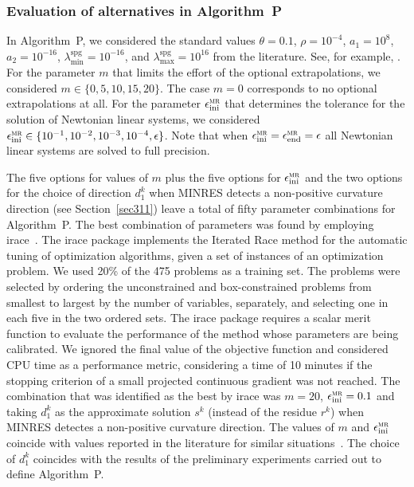 \documentclass[11pt]{article}
\begin{document}
\subsubsection{Evaluation of alternatives in Algorithm~P}

In Algorithm~P, we considered the standard values $\theta = 0.1$, $\rho = 10^{-4}$, $a_1 = 10^8$, $a_2 = 10^{-16}$, $\lambda_{\min}^{\mathrm{spg}} = 10^{-16}$, and $\lambda_{\max}^{\mathrm{spg}} = 10^{16}$ from the literature. See, for example, \cite{bmgencan}. For the parameter $m$ that limits the effort of the optional extrapolations, we considered $m \in \{0, 5, 10, 15, 20\}$. The case $m=0$ corresponds to no optional extrapolations at all. For the parameter $\epsilon^{\mathrm{\textsc{mr}}}_{\mathrm{ini}}$ that determines the tolerance for the solution of Newtonian linear systems, we considered $\epsilon^{\mathrm{\textsc{mr}}}_{\mathrm{ini}} \in \{ 10^{-1}, 10^{-2}, 10^{-3}, 10^{-4}, \epsilon \}$. Note that when $\epsilon^{\mathrm{\textsc{mr}}}_{\mathrm{ini}} = \epsilon^{\mathrm{\textsc{mr}}}_{\mathrm{end}}=\epsilon$ all Newtonian linear systems are solved to full precision. 

The five options for values of $m$ plus the five options for $\epsilon^{\mathrm{\textsc{mr}}}_{\mathrm{ini}}$ and the two options for the choice of direction $d_1^k$ when MINRES detects a non-positive curvature direction (see Section~\ref{sec311}) leave a total of fifty parameter combinations for Algorithm~P. The best combination of parameters was found by employing irace~\cite{irace}. The irace package implements the Iterated Race method for the automatic tuning of optimization algorithms, given a set of instances of an optimization problem. We used 20\% of the 475 problems as a training set. The problems were selected by ordering the unconstrained and box-constrained problems from smallest to largest by the number of variables, separately, and selecting one in each five in the two ordered sets. The irace package requires a scalar merit function to evaluate the performance of the method whose parameters are being calibrated. We ignored the final value of the objective function and considered CPU time as a performance metric, considering a time of 10 minutes if the stopping criterion of a small projected continuous gradient was not reached. The combination that was identified as the best by irace was $m=20$, $\epsilon^{\mathrm{\textsc{mr}}}_{\mathrm{ini}}=0.1$ and taking $d_1^k$ as the approximate solution $s^k$ (instead of the residue $r^k$) when MINRES detectes a non-positive curvature direction. The values of $m$ and $\epsilon^{\mathrm{\textsc{mr}}}_{\mathrm{ini}}$ coincide with values reported in the literature for similar situations~\cite{bmgencan}. The choice of $d_1^k$ coincides with the results of the preliminary experiments carried out to define Algorithm~P.
\end{document}
